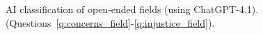 \begin{figure}[h!]
    \caption[AI classification of open-ended fields]{AI classification of open-ended fields (using ChatGPT-4.1). (Questions~\ref{q:concerns_field}-\ref{q:injustice_field}).
    }\label{fig:field_gpt}
\end{figure}

